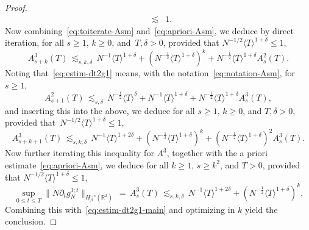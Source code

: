 \documentclass[10pt,a4paper]{amsart}
\newcommand{\R}{\mathbb R}
\begin{document}
\begin{proof}
\begin{eqnarray}
&\lesssim&1.\label{eq:apriori-Asm}
\end{eqnarray}
Now combining~\eqref{eq:toiterate-Asm} and~\eqref{eq:apriori-Asm},
we deduce by direct iteration, for all $s\ge1$, $k\ge0$, and~$T,\delta>0$, provided that $N^{-1/2}\langle T\rangle^{1+\delta}\le1$,
\[A_{s+k}^3(T)\,\lesssim_{s,k,\delta}\,N^{-1}\langle T\rangle^{1+\delta}+(N^{-\frac12}\langle T\rangle^{1+\delta})^k+N^{-\frac12}\langle T\rangle^{1+\delta}A_s^2(T).\]
Noting that~\eqref{eq:estim-dt2g1} means, with the notation~\eqref{eq:notation-Asm}, for $s\ge1$,
\begin{equation}
A_{s+1}^2(T)
\,\lesssim_{s,\delta}\,N^{-\frac12}{\langle T\rangle^\delta}+N^{-1}\langle T\rangle^{1+\delta} +N^{-\frac12}\langle T\rangle^{1+\delta}A_s^3(T),
\end{equation}
and inserting this into the above,
we deduce for all $s\ge1$, $k\ge0$, and $T,\delta>0$, provided that~$N^{-1/2}\langle T\rangle^{1+\delta}\le1$,
\[A_{s+k+1}^3(T)\,\lesssim_{s,k,\delta}\,N^{-1}\langle T\rangle^{1+2\delta}+(N^{-\frac12}\langle T\rangle^{1+\delta})^k+(N^{-\frac12}\langle T\rangle^{1+\delta})^2A_{s}^3(T).\]
Now further iterating this inequality for $A^3$, together with the a priori estimate~\eqref{eq:apriori-Asm}, we deduce for all $k\ge1$, $s\ge k^2$, and $T>0$, provided that $N^{-1/2}\langle T\rangle^{1+\delta}\le1$,
\[\sup_{0\le t\le T}\|N\partial_tg_N^{3;t}\|_{H^{-s}_\beta(\R^2)}\,=\,A_{s}^3(T)\,\lesssim_{s,k,\delta}\,N^{-1}\langle T\rangle^{1+2\delta}+(N^{-\frac12}\langle T\rangle^{1+\delta})^k.\]
Combining this with~\eqref{eq:estim-dt2g1-main} and optimizing in $k$ yield the conclusion.
\end{proof}
\end{document}
